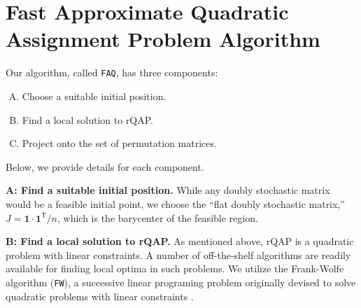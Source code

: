 \documentclass[11pt]{article}
\providecommand{\ve}[1]{\boldsymbol{#1}}
\newcommand{\T}{^{\ensuremath{\mathsf{T}}}}           %
\providecommand{\mc}[1]{\mathcal{#1}}
\providecommand{\mh}[1]{\hat{#1}}
\newcommand{\FAQ}{\texttt{FAQ} }
\begin{document}





\section{Fast Approximate Quadratic Assignment Problem Algorithm} %
\label{sec:FAQ}


Our algorithm, called \texttt{FAQ}, has three components:
\begin{enumerate}[A.]
	\item Choose a suitable initial position. %
	\item Find a local solution to rQAP. %
	\item Project onto the set of permutation matrices. %
\end{enumerate}
Below, we provide details for each component.

\textbf{A: Find a suitable initial position.}  While any doubly stochastic matrix would be a feasible initial point, we choose the 
``flat doubly  stochastic matrix,'' $J=\ve{1} \cdot \ve{1}\T/n$, which is the barycenter of the feasible region.


\textbf{B: Find a local solution to rQAP.} As mentioned above, rQAP is a quadratic problem with linear constraints.  A number of off-the-shelf algorithms are readily available for finding local optima in such problems.  We utilize the Frank-Wolfe algorithm (\texttt{FW}), a successive linear programing problem originally devised to solve quadratic problems with linear constraints \cite{Frank1956, Bradley1977}.
\end{document}
